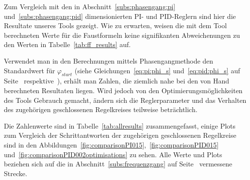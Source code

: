 Zum     Vergleich     mit    den     in     Abschnitt~\ref{subs:phasengang:pi}
und~\ref{subs:phasengang:pid}  dimensionierten PI-  und PID-Reglern  sind hier
die Resultate unseres Tools gezeigt. Wie zu  erwarten, weisen die mit dem Tool
berechneten Werte f\"ur die Faustformeln keine signifikanten Abweichenungen zu
den Werten in Tabelle~\ref{tab:ff_results} auf.

Verwendet        man         in        den         Berechnungen        mittels
Phasengangmethode      den      Standardwert      f\"ur      $\varphi_{start}$
(siehe      Gleichungen~\ref{eq:pi:phi_s}      und~\ref{eq:pid:phi_s}      auf
Seite~\pageref{eq:pi:phi_s}  respektive~\pageref{eq:pid:phi_s}), erh\"alt  man
Zahlen, die ziemlich nahe bei den von Hand berechneten Resultaten liegen. Wird
jedoch  von  den  Optimierungsm\"oglichkeiten   des  Tools  Gebrauch  gemacht,
\"andern  sich  die  Reglerparameter   und  das  Verhalten  des  zugeh\"origen
geschlossenen Regelkreises teilweise betr\"achtlich.

Die        Zahlenwerte       sind        in       Tabelle~\ref{tab:allresults}
zusammengefasst,       einige       Plots        zum       Vergleich       der
Schrittantworten    der   zugeh\"origen    geschlossenen   Regelkreise    sind
in    den    Abbildungen~\ref{fig:comparisonPI015},~\ref{fig:comparisonPID015}
und~\ref{fig:comparisonPID002optimisations}   zu   sehen.   Alle   Werte   und
Plots  beziehen   sich  auf   die  in   Abschnitt~\ref{subs:frequenzgang}  auf
Seite~\pageref{subs:frequenzgang} vermessene Strecke.

